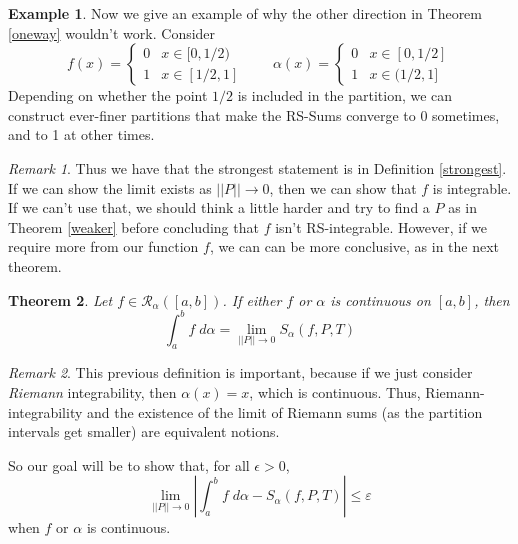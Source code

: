 \documentclass[12pt]{article}
\theoremstyle{plain}
\newtheorem{thm}{Theorem}[subsection]
\theoremstyle{definition}
\newtheorem{ex}[thm]{Example}
\theoremstyle{remark}
\newtheorem*{rmk}{Remark}
\begin{document}
\begin{ex}
Now we give an example of why the other direction in Theorem \ref{oneway} wouldn't work.  Consider
\[ f(x) = \begin{cases} 0 & x \in [0, 1/2) \\ 1 & x \in [1/2, 1] 
        \end{cases}  \qquad
    \alpha(x) = \begin{cases} 0 & x \in [0,1/2] \\ 1& x\in(1/2, 1] 
        \end{cases} \]
Depending on whether the point $1/2$ is included in the partition, we can construct ever-finer partitions that make the RS-Sums converge to 0 sometimes, and to 1 at other times.
\end{ex}
\begin{rmk}
Thus we have that the strongest statement is in Definition \ref{strongest}. If we can show the limit exists as $||P||\rightarrow 0$, then we can show that $f$ is integrable. If we can't use that, we should think a little harder and try to find a $P$ as in Theorem \ref{weaker} before concluding that $f$ isn't RS-integrable. However, if we require more from our function $f$, we can can be more conclusive, as in the next theorem.
\end{rmk}

\begin{thm}
Let $f\in\mathscr{R}_\alpha([a,b])$. If either $f$ or $\alpha$ is continuous on $[a,b]$, then 
\begin{equation}
    \label{limsum.toprove}
    \int^b_a f\;d\alpha = \lim_{||P||\rightarrow 0} 
    S_\alpha(f,P,T) 
\end{equation}
\end{thm}
\begin{rmk}
This previous definition is important, because if we just consider \emph{Riemann} integrability, then $\alpha(x) = x$, which is continuous. Thus, Riemann-integrability and the existence of the limit of Riemann sums (as the partition intervals get smaller) are equivalent notions.
\end{rmk}
So our goal will be to show that, for all $\epsilon>0$,
\begin{equation}
    \label{contequiv.toshow}
    \lim_{||P||\rightarrow 0}
    \left\lvert \int^b_a f \; d\alpha - S_\alpha(f,P,T) \right\rvert
        \leq \varepsilon
\end{equation}
when $f$ or $\alpha$ is continuous.
\end{document}

